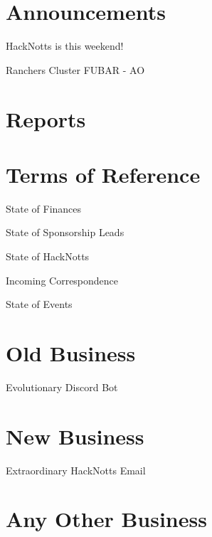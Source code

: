 \documentclass[11pt,hacksoc,agenda]{meetingmins}
\begin{document}
\maketitle

\section{Announcements}
\begin{items}
\item HackNotts is this weekend!
\item Ranchers Cluster FUBAR - AO
\end{items}

\section{Reports}

\section{Terms of Reference}
\begin{items}
\item {State of Finances}
\item {State of Sponsorship Leads}
\item {State of HackNotts}
\item {Incoming Correspondence}
\item {State of Events}
\end{items}

\section{Old Business}
\begin{items}
\item Evolutionary Discord Bot
\end{items}


\section{New Business}
\begin{items}
\item Extraordinary HackNotts Email
\end{items}


\section{Any Other Business}

\vspace{1em}
\end{document}

